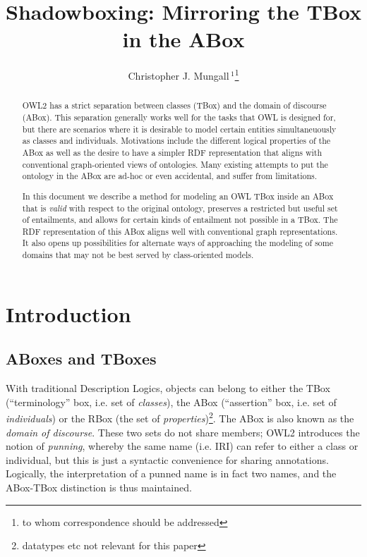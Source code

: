 \documentclass{my}
\begin{document}

\title{Shadowboxing: Mirroring the TBox in the ABox}

\author{Christopher J. Mungall\,$^{1}$\footnote{to whom correspondence should be addressed}}
\address{$^{1}$Genomics Division, Lawrence Berkeley National Laboratory, MS84R017, 1 Cyclotron Road, Berkeley, CA 94720 USA}

\history{}

\editor{}

\maketitle

\begin{abstract}

OWL2 has a strict separation between classes (TBox) and the domain of
discourse (ABox). This separation generally works well for the tasks
that OWL is designed for, but there are scenarios where it is
desirable to model certain entities simultaneuously as classes and
individuals. Motivations include the different logical properties of
the ABox as well as the desire to have a simpler RDF representation
that aligns with conventional graph-oriented views of ontologies. Many
existing attempts to put the ontology in the ABox are ad-hoc or even
accidental, and suffer from limitations.

In this document we describe a method for modeling an OWL TBox inside
an ABox that is \emph{valid} with respect to the original ontology,
preserves a restricted but useful set of entailments, and allows for
certain kinds of entailment not possible in a TBox. The RDF
representation of this ABox aligns well with conventional graph
representations. It also opens up possibilities for alternate ways of
approaching the modeling of some domains that may not be best served
by class-oriented models.

\end{abstract}

\section{Introduction}

\subsection{ABoxes and TBoxes}

With traditional Description Logics, objects can belong to either the
TBox (``terminology'' box, i.e. set of \emph{classes}), the ABox
(``assertion'' box, i.e. set of \emph{individuals}) or the RBox (the
set of \emph{properties})\footnote{datatypes etc not relevant for
  this paper}. The ABox is also known as the \emph{domain of
  discourse}. These two sets do not share members; OWL2 introduces the
notion of \emph{punning}, whereby the same name (i.e. IRI) can refer
to either a class or individual, but this is just a syntactic
convenience for sharing annotations. Logically, the interpretation of
a punned name is in fact two names, and the ABox-TBox distinction is
thus maintained.
\end{document}
